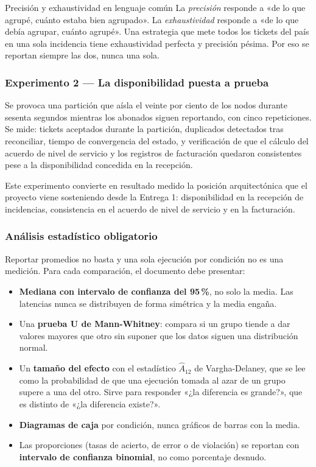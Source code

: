 \documentclass[11pt,a4paper]{article}
\begin{document}
	\begin{defBox}{Precisión y exhaustividad en lenguaje común}
		La \emph{precisión} responde a «de lo que agrupé, cuánto estaba bien agrupado». La \emph{exhaustividad} responde a «de lo que debía agrupar, cuánto agrupé». Una estrategia que mete todos los tickets del país en una sola incidencia tiene exhaustividad perfecta y precisión pésima. Por eso se reportan siempre las dos, nunca una sola.
	\end{defBox}
	
	\subsubsection{Experimento 2 --- La disponibilidad puesta a prueba}
	
	Se provoca una partición que aísla el veinte por ciento de los nodos durante sesenta segundos mientras los abonados siguen reportando, con cinco repeticiones. Se mide: tickets aceptados durante la partición, duplicados detectados tras reconciliar, tiempo de convergencia del estado, y verificación de que el cálculo del acuerdo de nivel de servicio y los registros de facturación quedaron consistentes pese a la disponibilidad concedida en la recepción.
	
	Este experimento convierte en resultado medido la posición arquitectónica que el proyecto viene sosteniendo desde la Entrega 1: disponibilidad en la recepción de incidencias, consistencia en el acuerdo de nivel de servicio y en la facturación.
	
	\subsubsection{Análisis estadístico obligatorio}
	
	Reportar promedios no basta y una sola ejecución por condición no es una medición. Para cada comparación, el documento debe presentar:
	
	\begin{itemize}[leftmargin=*,itemsep=4pt]
		\item \textbf{Mediana con intervalo de confianza del 95\,\%}, no solo la media. Las latencias nunca se distribuyen de forma simétrica y la media engaña.
		\item Una \textbf{prueba U de Mann-Whitney}: compara si un grupo tiende a dar valores mayores que otro sin suponer que los datos siguen una distribución normal.
		\item Un \textbf{tamaño del efecto} con el estadístico $\hat{A}_{12}$ de Vargha-Delaney, que se lee como la probabilidad de que una ejecución tomada al azar de un grupo supere a una del otro. Sirve para responder «¿la diferencia es grande?», que es distinto de «¿la diferencia existe?».
		\item \textbf{Diagramas de caja} por condición, nunca gráficos de barras con la media.
		\item Las proporciones (tasas de acierto, de error o de violación) se reportan con \textbf{intervalo de confianza binomial}, no como porcentaje desnudo.
	\end{itemize}
	
\end{document}
